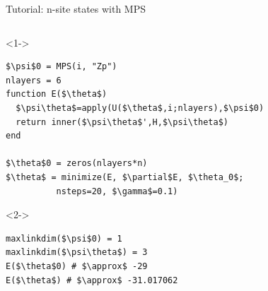 \begin{frame}[fragile]{Tutorial: n-site states with MPS}

\begin{columns}

\begin{column}{5.5cm}

\begin{onlyenv}<1->
\begin{lstlisting}[language=JuliaLocal, style=julia, mathescape, basicstyle=\scriptsize\ttfamily]
$\psi$0 = MPS(i, "Zp")
nlayers = 6
function E($\theta$)
  $\psi\theta$=apply(U($\theta$,i;nlayers),$\psi$0)
  return inner($\psi\theta$',H,$\psi\theta$)
end

$\theta$0 = zeros(nlayers*n)
$\theta$ = minimize(E, $\partial$E, $\theta_0$;
          nsteps=20, $\gamma$=0.1)
\end{lstlisting}
\end{onlyenv}

\begin{onlyenv}<2->
\begin{lstlisting}[language=JuliaLocal, style=julia, mathescape, basicstyle=\scriptsize\ttfamily]
maxlinkdim($\psi$0) = 1
maxlinkdim($\psi\theta$) = 3
E($\theta$0) # $\approx$ -29
E($\theta$) # $\approx$ -31.017062
\end{lstlisting}
\end{onlyenv}

\end{column}

\begin{column}{4.5cm}



\end{column}
\end{columns}
\end{frame}

